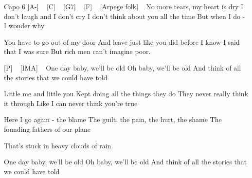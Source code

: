Capo 6
[A-] ~ [C] ~ [G7] ~ [F] ~
[Arpege folk] ~
No more tears, my heart is dry
I don't laugh and I don't cry
I don't think about you all the time
But when I do - I wonder why


You have to go out of my door
And leave just like you did before
I know I said that I was sure
But rich men can't imagine poor.

[P] ~ [IMA] ~
One day baby, we'll be old
Oh baby, we'll be old
And think of all the stories that we could have told

Little me and little you
Kept doing all the things they do
They never really think it through
Like I can never think you're true

Here I go again - the blame
The guilt, the pain, the hurt, the shame
The founding fathers of our plane

That's stuck in heavy clouds of rain.

One day baby, we'll be old
Oh baby, we'll be old
And think of all the stories that we could have told
